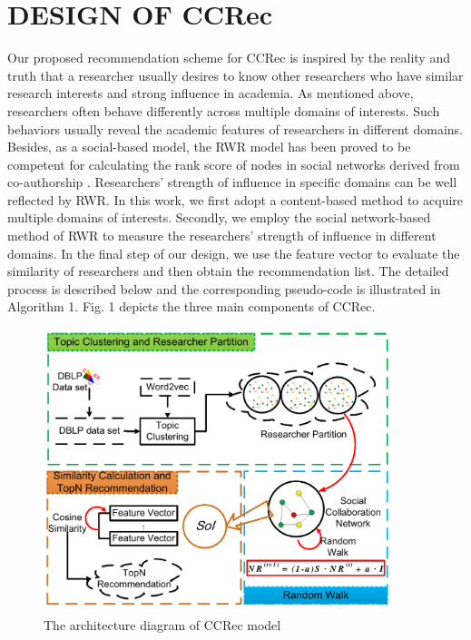 \documentclass[review]{elsarticle}
\begin{document}
\section{DESIGN OF CCRec}
Our proposed recommendation scheme for CCRec is inspired by the reality and truth that a researcher usually desires to know other researchers who have similar research interests and strong influence in academia. As mentioned above, researchers often behave differently across multiple domains of interests. Such behaviors usually reveal the academic features of researchers in different domains. Besides, as a social-based model, the RWR model has been proved to be competent for calculating the rank score of nodes in social networks derived from co-authorship \cite{li2014acrec}. Researchers' strength of influence in specific domains can be well reflected by RWR. In this work, we first adopt a content-based method to acquire multiple domains of interests. Secondly, we employ the social network-based method of RWR to measure the researchers' strength of influence in different domains. In the final step of our design, we use the feature vector to evaluate the similarity of researchers and then obtain the recommendation list. The detailed process is described below and the corresponding pseudo-code is illustrated in Algorithm 1. Fig. 1 depicts the three main components of CCRec.

\begin{figure}
\centering
\includegraphics [width=4in]{Fig1.pdf}
\caption{The architecture diagram of CCRec model}
\end{figure}
\end{document}
